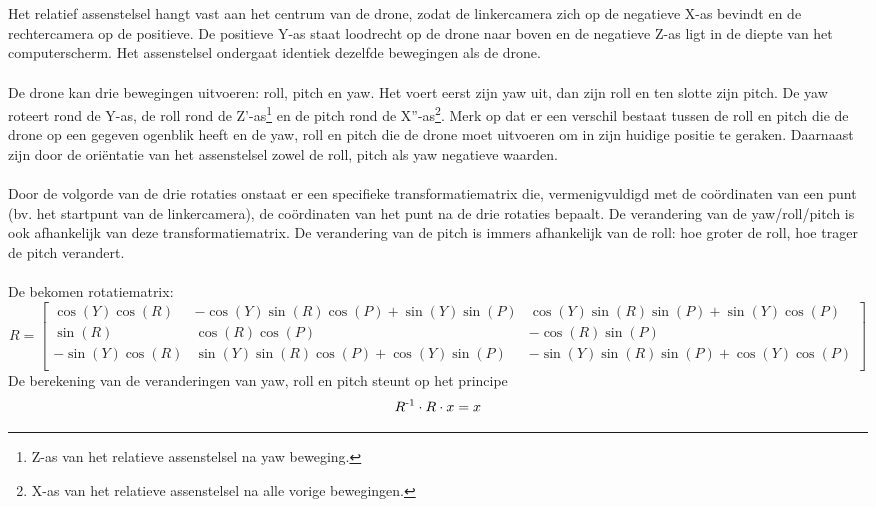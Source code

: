 \\
\\
Het relatief assenstelsel hangt vast aan het centrum van de drone, zodat de linkercamera zich op de negatieve X-as bevindt en de rechtercamera op de positieve. De positieve Y-as staat loodrecht op de drone naar boven en de negatieve Z-as ligt in de diepte van het computerscherm. Het assenstelsel ondergaat identiek dezelfde bewegingen als de drone.
\\
\\
De drone kan drie bewegingen uitvoeren: roll, pitch en yaw. Het voert eerst zijn yaw uit, dan zijn roll en ten slotte zijn pitch. De yaw roteert rond de Y-as, de roll rond de Z'-as\footnote{Z-as van het relatieve assenstelsel na yaw beweging.} en de pitch rond de X''-as\footnote{X-as van het relatieve assenstelsel na alle vorige bewegingen.}. Merk op dat er een verschil bestaat tussen de roll en pitch die de drone op een gegeven ogenblik heeft en de yaw, roll en pitch die de drone moet uitvoeren om in zijn huidige positie te geraken. Daarnaast zijn door de ori\"entatie van het assenstelsel zowel de roll, pitch als yaw negatieve waarden.
\\
\\
Door de volgorde van de drie rotaties onstaat er een specifieke transformatiematrix die, vermenigvuldigd met de coördinaten van een punt (bv. het startpunt van de linkercamera), de coördinaten van het punt na de drie rotaties bepaalt. De verandering van de yaw/roll/pitch is ook afhankelijk van deze transformatiematrix. De verandering van de pitch is immers afhankelijk van de roll: hoe groter de roll, hoe trager de pitch verandert. 
\\
\\
De bekomen rotatiematrix:
\begin{equation*}
R = 
\begin{bmatrix}
\cos(Y)\cos(R) & -\cos(Y)\sin(R)\cos(P) + \sin(Y)\sin(P) & \cos(Y)\sin(R)\sin(P)+\sin(Y)\cos(P) \\
\sin(R) & \cos(R)\cos(P) & -\cos(R)\sin(P) \\ 
-\sin(Y)\cos(R) & \sin(Y)\sin(R)\cos(P)+\cos(Y)\sin(P) & -\sin(Y)\sin(R)\sin(P)+\cos(Y)\cos(P)\\
\end{bmatrix}
\end{equation*}
De berekening van de veranderingen van yaw, roll en pitch steunt op het principe
\begin{equation*}
R\textsuperscript{-1} \cdot R \cdot x = x
\end{equation*} 
